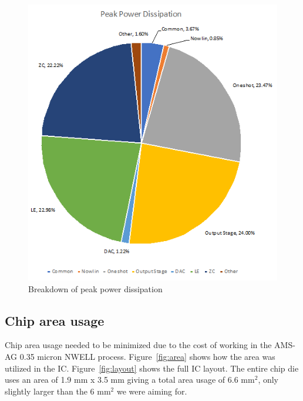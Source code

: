 \documentclass[12pt,oneside,final]{siuethesis}
\theoremstyle{definition}
\begin{document}
\begin{figure}[htbp!]
 \centering
 \includegraphics[scale=1]{./ch4_figures/peak_power.png}
 \caption{Breakdown of peak power dissipation}
 \label{fig:peak_pwr}
\end{figure} 

\subsection{Chip area usage}
\par Chip area usage needed to be minimized due to the cost of working in the AMS-AG 0.35 micron NWELL process. Figure~\ref{fig:area} shows how the area was utilized in the IC. Figure~\ref{fig:layout} shows the full IC layout. The entire chip die uses an area of 1.9 mm x 3.5 mm giving a total area usage of 6.6 mm$^{2}$, only slightly larger than the 6 mm$^{2}$ we were aiming for.
\end{document}
